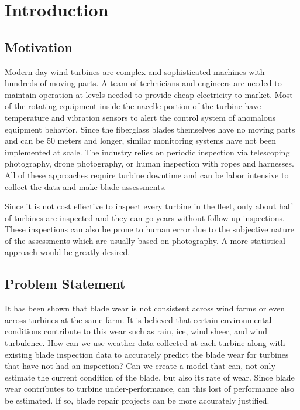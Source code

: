 \documentclass[runningheads]{llncs}
\begin{document}



  

\section{Introduction} 

\subsection{Motivation}   

Modern-day wind turbines are complex and sophisticated machines with hundreds of moving parts. A team of technicians and engineers are needed to maintain operation at levels needed to provide cheap electricity to market. Most of the rotating equipment inside the nacelle portion of the turbine have temperature and vibration sensors to alert the control system of anomalous equipment behavior. Since the fiberglass blades themselves have no moving parts and can be 50 meters and longer, similar monitoring systems have not been implemented at scale. The industry relies on periodic inspection via telescoping photography, drone photography, or human inspection with ropes and harnesses. All of these approaches require turbine downtime and can be labor intensive to collect the data and make blade assessments. 

Since it is not cost effective to inspect every turbine in the fleet, only about half of turbines are inspected and they can go years without follow up inspections. These inspections can also be prone to human error due to the subjective nature of the assessments which are usually based on photography. A more statistical approach would be greatly desired.

\subsection{Problem Statement} 

It has been shown that blade wear is not consistent across wind farms or even across turbines at the same farm. It is believed that certain environmental conditions contribute to this wear such as rain, ice, wind sheer, and wind turbulence. How can we use weather data collected at each turbine along with existing blade inspection data to accurately predict the blade wear for turbines that have not had an inspection? Can we create a model that can, not only estimate the current condition of the blade, but also its rate of wear. Since blade wear contributes to turbine under-performance, can this lost of performance also be estimated. If so, blade repair projects can be more accurately justified. 
\end{document}
